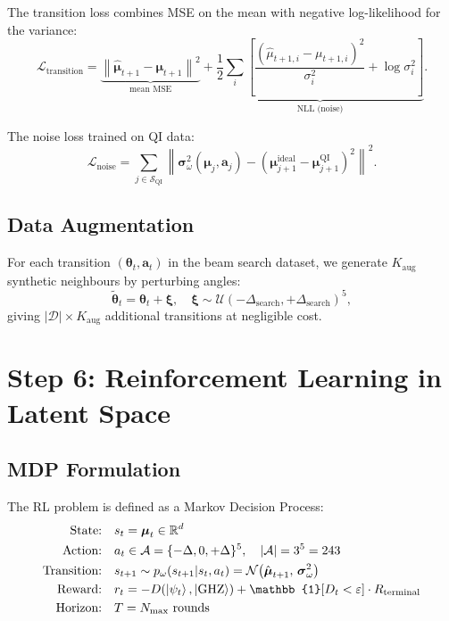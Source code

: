 \documentclass[11pt,a4paper]{article}
\begin{document}
The transition loss combines MSE on the mean with negative log-likelihood for the variance:
\begin{equation}
    \mathcal{L}_{\mathrm{transition}} =
    \underbrace{\left\|\hat{\boldsymbol{\mu}}_{t+1} - \boldsymbol{\mu}_{t+1}\right\|^2}_{\text{mean MSE}}
    + \underbrace{\frac{1}{2}\sum_i
    \left[\frac{(\hat{\mu}_{t+1,i} - \mu_{t+1,i})^2}{\sigma^2_i} + \log \sigma^2_i\right]}_{\text{NLL (noise)}}.
\end{equation}

The noise loss trained on QI data:
\begin{equation}
    \mathcal{L}_{\mathrm{noise}} =
    \sum_{j \in \mathcal{S}_{\mathrm{QI}}}
    \left\|\boldsymbol{\sigma}^2_\omega(\boldsymbol{\mu}_j, \mathbf{a}_j) -
    \left(\boldsymbol{\mu}_{j+1}^{\mathrm{ideal}} - \boldsymbol{\mu}_{j+1}^{\mathrm{QI}}\right)^2\right\|^2.
\end{equation}

\subsection{Data Augmentation}

For each transition $(\boldsymbol{\theta}_t, \mathbf{a}_t)$ in the beam search dataset,
we generate $K_{\mathrm{aug}}$ synthetic neighbours by perturbing angles:
\begin{equation}
    \tilde{\boldsymbol{\theta}}_t = \boldsymbol{\theta}_t + \boldsymbol{\xi},
    \quad
    \boldsymbol{\xi} \sim \mathcal{U}(-\Delta_{\mathrm{search}}, +\Delta_{\mathrm{search}})^5,
\end{equation}
giving $|\mathcal{D}| \times K_{\mathrm{aug}}$ additional transitions at negligible cost.

\section{Step 6: Reinforcement Learning in Latent Space}\label{sec:rl}

\subsection{MDP Formulation}

The RL problem is defined as a Markov Decision Process:
\begin{align}
    \text{State:}  &\quad s_t = \boldsymbol{\mu}_t \in \mathbb{R}^d \\
    \text{Action:} &\quad a_t \in \mathcal{A} = \{-\Delta, 0, +\Delta\}^5,
    \quad |\mathcal{A}| = 3^5 = 243 \\
    \text{Transition:} &\quad s_{t+1} \sim p_\omega(s_{t+1} | s_t, a_t) =
    \mathcal{N}\!\left(\hat{\boldsymbol{\mu}}_{t+1},\, \boldsymbol{\sigma}^2_\omega\right) \\
    \text{Reward:} &\quad r_t = -D\!\left(\ket{\psi_t}, \ket{\text{GHZ}}\right) +
    \mathbb{1}[D_t < \varepsilon] \cdot R_{\mathrm{terminal}} \\
    \text{Horizon:} &\quad T = N_{\max} \text{ rounds}
\end{align}
\end{document}

